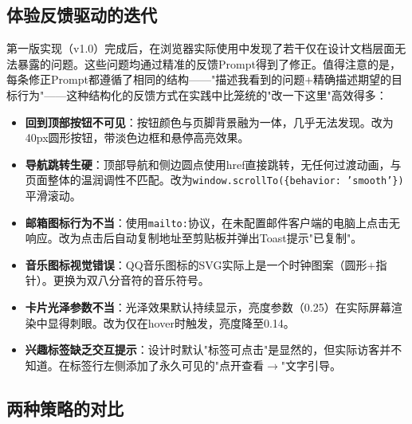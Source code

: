 \subsection{体验反馈驱动的迭代}

第一版实现（v1.0）完成后，在浏览器实际使用中发现了若干仅在设计文档层面无法暴露的问题。这些问题均通过精准的反馈Prompt得到了修正。值得注意的是，每条修正Prompt都遵循了相同的结构——"描述我看到的问题$+$精确描述期望的目标行为"——这种结构化的反馈方式在实践中比笼统的"改一下这里"高效得多：

\begin{itemize}
    \item \textbf{回到顶部按钮不可见}：按钮颜色与页脚背景融为一体，几乎无法发现。改为40px圆形按钮，带淡色边框和悬停高亮效果。
    \item \textbf{导航跳转生硬}：顶部导航和侧边圆点使用href直接跳转，无任何过渡动画，与页面整体的温润调性不匹配。改为\texttt{window.scrollTo(\{behavior: 'smooth'\})}平滑滚动。
    \item \textbf{邮箱图标行为不当}：使用\texttt{mailto:}协议，在未配置邮件客户端的电脑上点击无响应。改为点击后自动复制地址至剪贴板并弹出Toast提示"已复制"。
    \item \textbf{音乐图标视觉错误}：QQ音乐图标的SVG实际上是一个时钟图案（圆形$+$指针）。更换为双八分音符的音乐符号。
    \item \textbf{卡片光泽参数不当}：光泽效果默认持续显示，亮度参数（0.25）在实际屏幕渲染中显得刺眼。改为仅在hover时触发，亮度降至0.14。
    \item \textbf{兴趣标签缺乏交互提示}：设计时默认"标签可点击"是显然的，但实际访客并不知道。在标签行左侧添加了永久可见的"点开查看$\rightarrow$"文字引导。
\end{itemize}

\subsection{两种策略的对比}

\begin{table}[t]
\centering
\caption{两种Vibe Coding策略的定性对比。}
\label{tab:comparison}
\end{table}

